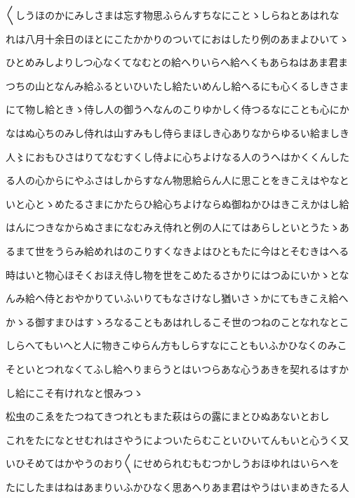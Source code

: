 \documentclass[a4paper,11pt,landscape]{ltjtarticle}
\begin{document}
\par\medskip
〱しうほのかにみしさまは忘す物思ふらんすちなにことゝしらねとあはれな
\par\medskip
れは八月十余日のほとにこたかかりのついてにおはしたり例のあまよひいてゝ
\par\medskip
ひとめみしよりしつ心なくてなむとの給へりいらへ給へくもあらねはあま君ま
\par\medskip
つちの山となんみ給ふるといひいたし給たいめんし給へるにも心くるしきさま
\par\medskip
にて物し給ときゝ侍し人の御うへなんのこりゆかしく侍つるなにことも心にか
\par\medskip
なはぬ心ちのみし侍れは山すみもし侍らまほしき心ありなからゆるい給ましき
\par\medskip
人〻におもひさはりてなむすくし侍よに心ちよけなる人のうへはかくくんした
\par\medskip
る人の心からにやふさはしからすなん物思給らん人に思ことをきこえはやなと
\par\medskip
いと心とゝめたるさまにかたらひ給心ちよけならぬ御ねかひはきこえかはし給
\par\medskip
はんにつきなからぬさまになむみえ侍れと例の人にてはあらしといとうたゝあ
\par\medskip
るまて世をうらみ給めれはのこりすくなきよはひともたに今はとそむきはへる
\par\medskip
時はいと物心ほそくおほえ侍し物を世をこめたるさかりにはつゐにいかゝとな
\par\medskip
んみ給へ侍とおやかりていふいりてもなさけなし猶いさゝかにてもきこえ給へ
\par\medskip
かゝる御すまひはすゝろなることもあはれしるこそ世のつねのことなれなとこ
\par\medskip
しらへてもいへと人に物きこゆらん方もしらすなにこともいふかひなくのみこ
\par\medskip
そといとつれなくてふし給へりまらうとはいつらあな心うあきを契れるはすか
\par\medskip
し給にこそ有けれなと恨みつゝ
\par\medskip
松虫のこゑをたつねてきつれともまた萩はらの露にまとひぬあないとおし
\par\medskip
これをたになとせむれはさやうによついたらむこといひいてんもいと心うく又
\par\medskip
いひそめてはかやうのおり〱にせめられむもむつかしうおほゆれはいらへを
\par\medskip
たにしたまはねはあまりいふかひなく思あへりあま君はやうはいまめきたる人
\par\medskip
\end{document}
